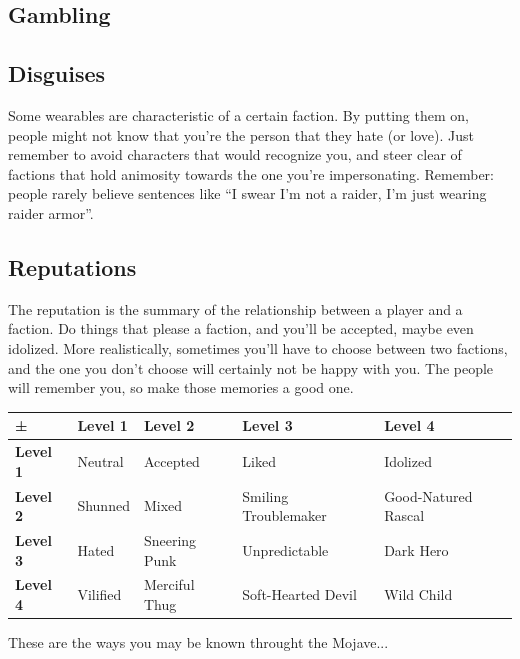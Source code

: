 \documentclass[11pt]{article} %
\begin{document}
\subsection{Gambling}

\subsection{Disguises}

Some wearables are characteristic of a certain faction. By putting them on, people might not know that you're the person that they hate (or love). Just remember to avoid characters that would recognize you, and steer clear of factions that hold animosity towards the one you're impersonating. Remember: people rarely believe sentences like ``I swear I'm not a raider, I'm just wearing raider armor''.

\subsection{Reputations} 

The reputation is the summary of the relationship between a player and a faction. Do things that please a faction, and you'll be accepted, maybe even idolized. More realistically, sometimes you'll have to choose between two factions, and the one you don't choose will certainly not be happy with you. The people will remember you, so make those memories a good one.

\begin{longtable}{|p{2.3cm}|p{2.3cm}|p{2.3cm}|p{2.3cm}|p{2.3cm}|}
\hline
\textbf{±}  & \textbf{Level 1} & \textbf{Level 2} & \textbf{Level 3} & \textbf{Level 4} \\
\hline
\endhead
\textbf{Level 1} & Neutral & Accepted & Liked & Idolized \\
\hline
\textbf{Level 2} & Shunned & Mixed & Smiling Troublemaker & Good-Natured Rascal \\
\hline
\textbf{Level 3} & Hated & Sneering Punk & Unpredictable & Dark Hero \\
\hline
\textbf{Level 4} & Vilified & Merciful Thug & Soft-Hearted Devil & Wild Child \\
\hline
\end{longtable}{These are the ways you may be known throught the Mojave...}
\end{document}
